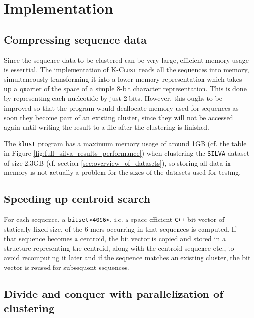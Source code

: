 \section{Implementation} \label{sec:implementation}

\subsection{Compressing sequence data}

Since the sequence data to be clustered can be very large, efficient memory
usage is essential. The implementation of \textsc{K-Clust} reads all the
sequences into memory, simultaneously transforming it into a lower memory
representation which takes up a quarter of the space of a simple 8-bit
character representation. This is done by representing each nucleotide by just
2 bits. However, this ought to be improved so that the program would deallocate
memory used for sequences as soon they become part of an existing cluster,
since they will not be accessed again until writing the result to a file after
the clustering is finished.

The \texttt{klust} program has a maximum memory usage of around 1GB (cf. the
table in Figure \ref{fig:full_silva_results_performance}) when clustering the
\texttt{SILVA} dataset of size 2.3GB (cf. section
\ref{sec:overview_of_datasets}), so storing all data in memory is not actually
a problem for the sizes of the datasets used for testing.


\subsection{Speeding up centroid search}

For each sequence, a \verb|bitset<4096>|, i.e. a space efficient \texttt{C++}
bit vector of statically fixed size, of the $6$-mers occurring in that
sequences is computed. If that sequence becomes a centroid, the bit vector is
copied and stored in a structure representing the centroid, along with the
centroid sequence etc., to avoid recomputing it later and if the sequence
matches an existing cluster, the bit vector is reused for subsequent sequences.



\subsection{Divide and conquer with parallelization of clustering}

